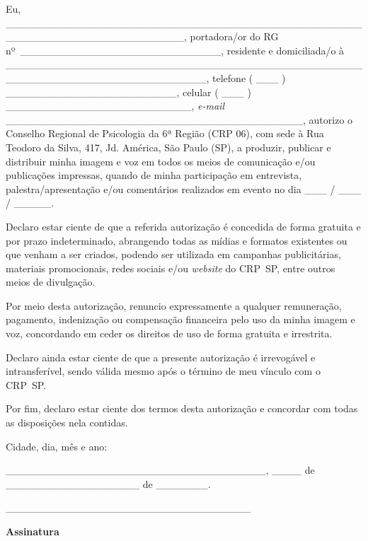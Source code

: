 Eu,
\_\_\_\_\_\_\_\_\_\_\_\_\_\_\_\_\_\_\_\_\_\_\_\_\_\_\_\_\_\_\_\_\_\_\_\_\_\_\_\_\_\_\_\_\_\_\_\_\_\_\_\_\_\_\_\_\_\_\_\_\_\_\_\_\_\_\_\_\_\_\_\_,
portadora/or do RG
nº~\_\_\_\_\_\_\_\_\_\_\_\_\_\_\_\_\_\_\_\_\_\_\_\_\_\_\_, residente e
domiciliada/o à
\_\_\_\_\_\_\_\_\_\_\_\_\_\_\_\_\_\_\_\_\_\_\_\_\_\_\_\_\_\_\_\_\_\_\_\_\_\_\_\_\_\_\_\_\_\_\_\_\_\_\_\_\_\_\_\_\_\_\_\_\_\_\_\_\_\_\_\_\_\_\_\_\_\_\_,
telefone ( \_\_\_ ) \_\_\_\_\_\_\_\_\_\_\_\_\_\_\_\_\_\_\_\_\_\_\_,
celular ( \_\_\_ ) \_\_\_\_\_\_\_\_\_\_\_\_\_\_\_\_\_\_\_\_\_\_\_\_\_,
\emph{e-mail}
\_\_\_\_\_\_\_\_\_\_\_\_\_\_\_\_\_\_\_\_\_\_\_\_\_\_\_\_\_\_\_\_\_\_\_\_\_\_\_\_,
autorizo o Conselho Regional de Psicologia da 6ª Região (CRP 06), com
sede à Rua Teodoro da Silva, 417, Jd. América, São Paulo (SP), a
produzir, publicar e distribuir minha imagem e voz em todos os meios de
comunicação e/ou publicações impressas, quando de minha participação em
entrevista, palestra/apresentação e/ou comentários realizados em evento
no dia \_\_\_ / \_\_\_ / \_\_\_\_\_.

Declaro estar ciente de que a referida autorização é concedida de forma
gratuita e por prazo indeterminado, abrangendo todas as mídias e
formatos existentes ou que venham a ser criados, podendo ser utilizada
em campanhas publicitárias, materiais promocionais, redes sociais e/ou
\emph{website} do CRP~SP, entre outros meios de divulgação.

Por meio desta autorização, renuncio expressamente a qualquer
remuneração, pagamento, indenização ou compensação financeira pelo uso
da minha imagem e voz, concordando em ceder os direitos de uso de forma
gratuita e irrestrita.

Declaro ainda estar ciente de que a presente autorização é irrevogável e
intransferível, sendo válida mesmo após o término de meu vínculo com o
CRP~SP.

Por fim, declaro estar ciente dos termos desta autorização e concordar
com todas as disposições nela contidas.

Cidade, dia, mês e ano:

\_\_\_\_\_\_\_\_\_\_\_\_\_\_\_\_\_\_\_\_\_\_\_\_\_\_\_\_\_\_\_\_\_\_\_,
\_\_\_\_ de \_\_\_\_\_\_\_\_\_\_\_\_\_\_\_\_\_\_ de \_\_\_\_\_\_\_.

\_\_\_\_\_\_\_\_\_\_\_\_\_\_\_\_\_\_\_\_\_\_\_\_\_\_\_\_\_\_\_\_\_

\textbf{Assinatura}


